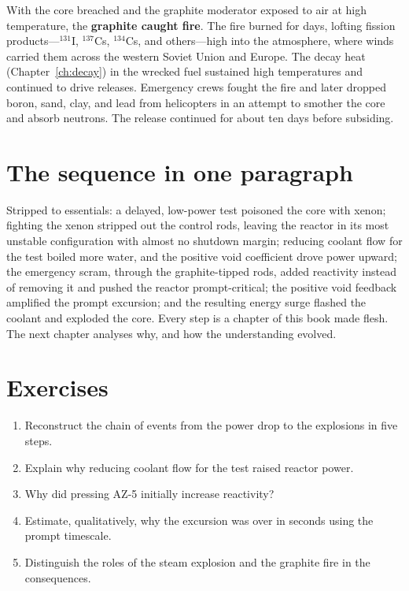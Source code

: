 With the core breached and the graphite moderator exposed to air at high
temperature, the \textbf{graphite caught fire}. The fire burned for days, lofting
fission products---$^{131}$I, $^{137}$Cs, $^{134}$Cs, and others---high into the
atmosphere, where winds carried them across the western Soviet Union and Europe.
The decay heat (Chapter~\ref{ch:decay}) in the wrecked fuel sustained high
temperatures and continued to drive releases. Emergency crews fought the fire and
later dropped boron, sand, clay, and lead from helicopters in an attempt to
smother the core and absorb neutrons. The release continued for about ten days
before subsiding.

\section{The sequence in one paragraph}

Stripped to essentials: a delayed, low-power test poisoned the core with xenon;
fighting the xenon stripped out the control rods, leaving the reactor in its most
unstable configuration with almost no shutdown margin; reducing coolant flow for
the test boiled more water, and the positive void coefficient drove power upward;
the emergency scram, through the graphite-tipped rods, added reactivity instead of
removing it and pushed the reactor prompt-critical; the positive void feedback
amplified the prompt excursion; and the resulting energy surge flashed the coolant
and exploded the core. Every step is a chapter of this book made flesh. The next
chapter analyses why, and how the understanding evolved.


\section*{Exercises}
\begin{enumerate}[leftmargin=*,itemsep=2pt]
\item Reconstruct the chain of events from the power drop to the explosions in five steps.
\item Explain why reducing coolant flow for the test raised reactor power.
\item Why did pressing AZ-5 initially increase reactivity?
\item Estimate, qualitatively, why the excursion was over in seconds using the prompt timescale.
\item Distinguish the roles of the steam explosion and the graphite fire in the consequences.
\end{enumerate}
